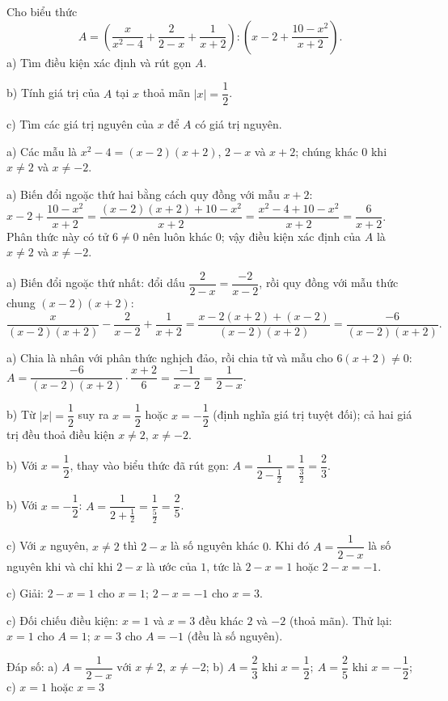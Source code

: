 \begin{problem}[8DS-PS-010]
Cho biểu thức
\[ A = \left(\dfrac{x}{x^2 - 4} + \dfrac{2}{2 - x} + \dfrac{1}{x + 2}\right) : \left(x - 2 + \dfrac{10 - x^2}{x + 2}\right). \]
a) Tìm điều kiện xác định và rút gọn $A$.

b) Tính giá trị của $A$ tại $x$ thoả mãn $|x| = \dfrac{1}{2}$.

c) Tìm các giá trị nguyên của $x$ để $A$ có giá trị nguyên.

\begin{solution}
a) Các mẫu là $x^2 - 4 = (x - 2)(x + 2)$, $2 - x$ và $x + 2$; chúng khác $0$ khi $x \neq 2$ và $x \neq -2$.

a) Biến đổi ngoặc thứ hai bằng cách quy đồng với mẫu $x + 2$: $x - 2 + \dfrac{10 - x^2}{x + 2} = \dfrac{(x - 2)(x + 2) + 10 - x^2}{x + 2} = \dfrac{x^2 - 4 + 10 - x^2}{x + 2} = \dfrac{6}{x + 2}$. Phân thức này có tử $6 \neq 0$ nên luôn khác $0$; vậy điều kiện xác định của $A$ là $x \neq 2$ và $x \neq -2$.

a) Biến đổi ngoặc thứ nhất: đổi dấu $\dfrac{2}{2 - x} = \dfrac{-2}{x - 2}$, rồi quy đồng với mẫu thức chung $(x - 2)(x + 2)$:
\[ \dfrac{x}{(x - 2)(x + 2)} - \dfrac{2}{x - 2} + \dfrac{1}{x + 2} = \dfrac{x - 2(x + 2) + (x - 2)}{(x - 2)(x + 2)} = \dfrac{-6}{(x - 2)(x + 2)}. \]

a) Chia là nhân với phân thức nghịch đảo, rồi chia tử và mẫu cho $6(x + 2) \neq 0$: $A = \dfrac{-6}{(x - 2)(x + 2)} \cdot \dfrac{x + 2}{6} = \dfrac{-1}{x - 2} = \dfrac{1}{2 - x}$.

b) Từ $|x| = \dfrac{1}{2}$ suy ra $x = \dfrac{1}{2}$ hoặc $x = -\dfrac{1}{2}$ (định nghĩa giá trị tuyệt đối); cả hai giá trị đều thoả điều kiện $x \neq 2$, $x \neq -2$.

b) Với $x = \dfrac{1}{2}$, thay vào biểu thức đã rút gọn: $A = \dfrac{1}{2 - \frac{1}{2}} = \dfrac{1}{\frac{3}{2}} = \dfrac{2}{3}$.

b) Với $x = -\dfrac{1}{2}$: $A = \dfrac{1}{2 + \frac{1}{2}} = \dfrac{1}{\frac{5}{2}} = \dfrac{2}{5}$.

c) Với $x$ nguyên, $x \neq 2$ thì $2 - x$ là số nguyên khác $0$. Khi đó $A = \dfrac{1}{2 - x}$ là số nguyên khi và chỉ khi $2 - x$ là ước của $1$, tức là $2 - x = 1$ hoặc $2 - x = -1$.

c) Giải: $2 - x = 1$ cho $x = 1$; $2 - x = -1$ cho $x = 3$.

c) Đối chiếu điều kiện: $x = 1$ và $x = 3$ đều khác $2$ và $-2$ (thoả mãn). Thử lại: $x = 1$ cho $A = 1$; $x = 3$ cho $A = -1$ (đều là số nguyên).

Đáp số: a) $\boxed{A = \dfrac{1}{2 - x} \text{ với } x \neq 2,\ x \neq -2}$; b) $\boxed{A = \dfrac{2}{3} \text{ khi } x = \dfrac{1}{2};\ A = \dfrac{2}{5} \text{ khi } x = -\dfrac{1}{2}}$; c) $\boxed{x = 1 \text{ hoặc } x = 3}$
\end{solution}
\end{problem}

